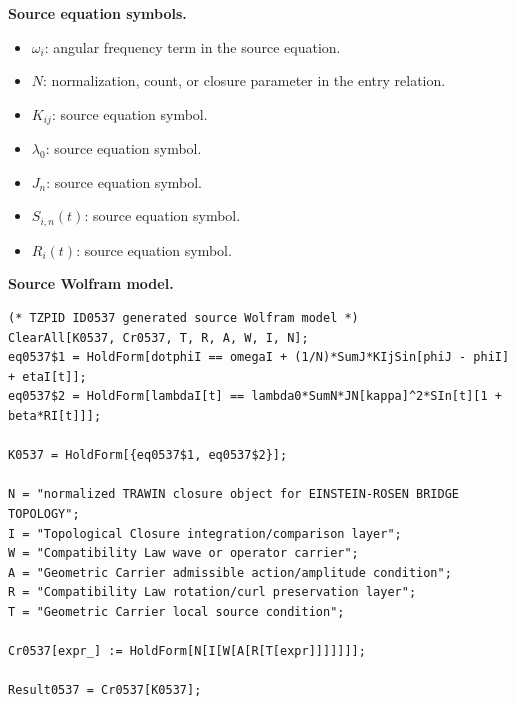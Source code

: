 \begin{minipage}[t]{0.49\linewidth}
\begingroup
\small
\raggedright
\textbf{Source equation symbols.}\par
\begin{itemize}[leftmargin=1.35em,itemsep=1pt,topsep=1pt,parsep=0pt]
    \item $\omega_i$: angular frequency term in the source equation.
    \item $N$: normalization, count, or closure parameter in the entry relation.
    \item $K_{ij}$: source equation symbol.
    \item $\lambda_0$: source equation symbol.
    \item $J_n$: source equation symbol.
    \item $S_{i,n}(t)$: source equation symbol.
    \item $R_i(t)$: source equation symbol.
\end{itemize}
\endgroup
\end{minipage}\hfill
\begin{minipage}[t]{0.47\linewidth}
\begingroup
\scriptsize
\raggedright
\textbf{Source Wolfram model.}\par
\begin{Verbatim}[fontsize=\tiny,breaklines=true,breakanywhere=true]
(* TZPID ID0537 generated source Wolfram model *)
ClearAll[K0537, Cr0537, T, R, A, W, I, N];
eq0537$1 = HoldForm[dotphiI == omegaI + (1/N)*SumJ*KIjSin[phiJ - phiI] + etaI[t]];
eq0537$2 = HoldForm[lambdaI[t] == lambda0*SumN*JN[kappa]^2*SIn[t][1 + beta*RI[t]]];

K0537 = HoldForm[{eq0537$1, eq0537$2}];

N = "normalized TRAWIN closure object for EINSTEIN-ROSEN BRIDGE TOPOLOGY";
I = "Topological Closure integration/comparison layer";
W = "Compatibility Law wave or operator carrier";
A = "Geometric Carrier admissible action/amplitude condition";
R = "Compatibility Law rotation/curl preservation layer";
T = "Geometric Carrier local source condition";

Cr0537[expr_] := HoldForm[N[I[W[A[R[T[expr]]]]]]];

Result0537 = Cr0537[K0537];
\end{Verbatim}
\endgroup
\end{minipage}

